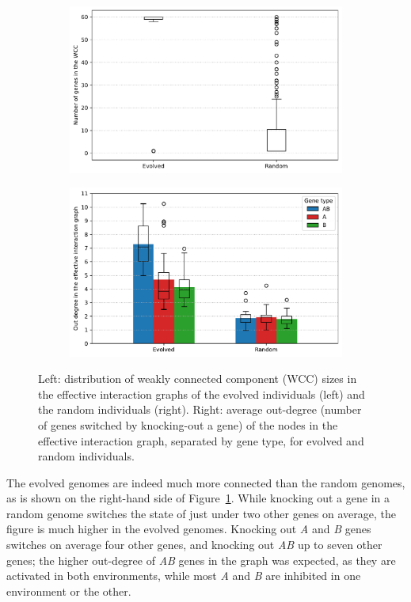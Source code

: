 \begin{figure}[H]
  \begin{subfigure}[t]{0.49\textwidth}
    \includegraphics[width=\textwidth]{ploscb/img/effective_graph_wcc_distr.pdf}
  \end{subfigure}
  \begin{subfigure}[t]{0.49\textwidth}
    \includegraphics[width=\textwidth]{ploscb/img/effective_graph_combined_out_degree.pdf}
  \end{subfigure}
  \caption{Left: distribution of weakly connected component (WCC) sizes in the effective interaction graphs of the evolved individuals (left) and the random individuals (right).
  Right: average out-degree (number of genes switched by knocking-out a gene) of the nodes in the effective interaction graph, separated by gene type, for evolved and random individuals.}
  \label{fig:ko_data}
\end{figure}

The evolved genomes are indeed much more connected than the random genomes, as is shown on the right-hand side of Figure~\ref{fig:ko_data}.
While knocking out a gene in a random genome switches the state of just under two other genes on average, the figure is much higher in the evolved genomes.
Knocking out \emph{A} and \emph{B} genes switches on average four other genes, and knocking out \emph{AB} up to seven other genes; the higher out-degree of \emph{AB} genes in the graph was expected, as they are activated in both environments, while most \emph{A} and \emph{B} are inhibited in one environment or the other.

